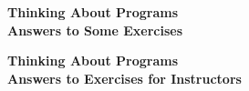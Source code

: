 \cleardoublepage
\pagestyle{plain}
\begin{center}
\LARGE\bf
Thinking About Programs \\
\Large
Answers to Some Exercises
\end{center}


\showallanswersS


\cleardoublepage
{}
\begin{center}
\LARGE\bf
Thinking About Programs \\
\Large
Answers to  Exercises for Instructors
\end{center}


\showallanswersI
